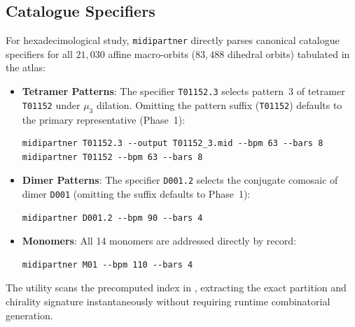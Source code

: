 \subsection{Catalogue Specifiers}
For hexadecimological study, \texttt{midipartner} directly parses canonical catalogue specifiers for all $21{,}030$ affine macro-orbits ($83{,}488$ dihedral orbits) tabulated in the atlas:
\begin{itemize}
    \item \textbf{Tetramer Patterns}: The specifier \texttt{T01152.3} selects pattern~3 of tetramer \texttt{T01152} under $\mu_3$ dilation. Omitting the pattern suffix (\texttt{T01152}) defaults to the primary representative (Phase~1):
{\small
\begin{verbatim}
midipartner T01152.3 --output T01152_3.mid --bpm 63 --bars 8
midipartner T01152 --bpm 63 --bars 8
\end{verbatim}}
    \item \textbf{Dimer Patterns}: The specifier \texttt{D001.2} selects the conjugate comosaic of dimer \texttt{D001} (omitting the suffix defaults to Phase~1):
{\small
\begin{verbatim}
midipartner D001.2 --bpm 90 --bars 4
\end{verbatim}}
    \item \textbf{Monomers}: All 14 monomers are addressed directly by record:
{\small
\begin{verbatim}
midipartner M01 --bpm 110 --bars 4
\end{verbatim}}
\end{itemize}
The utility scans the precomputed index in , extracting the exact partition and chirality signature instantaneously without requiring runtime combinatorial generation.

